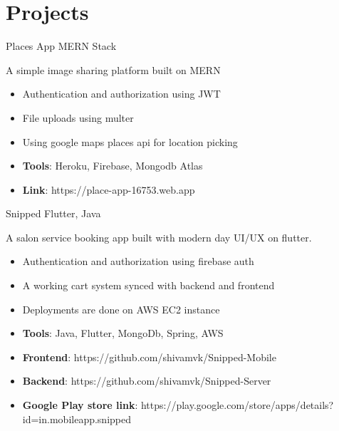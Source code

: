 \documentclass[letterpaper]{twentysecondcv} %
\begin{document}
\section{Projects}
\begin{twenty}
	\twentyitem
    	{}
		{}
        {Places App}
        {{}{MERN Stack}}
        {}
        {
       	\textbf{}A simple image sharing platform built on MERN 
        {\begin{itemize}
        \item Authentication and authorization using JWT
        \item File uploads using multer
        \item Using google maps places api for location picking
        \item \textbf{Tools}: Heroku, Firebase, Mongodb Atlas \item \textbf{Link}: https://place-app-16753.web.app \vspace{2mm}
		\end{itemize}}
        }
\end{twenty}
\vspace{2mm}
\begin{twenty}
	\twentyitem
    	{}
		{}
        {Snipped}
        {{}{Flutter, Java}}
        {}
        {
       	\textbf{}A salon service booking app built with modern day UI/UX on flutter.
        {\begin{itemize}
        \item Authentication and authorization using firebase auth
        \item A working cart system synced with backend and frontend
        \item Deployments are done on AWS EC2 instance
        \item \textbf{Tools}: Java, Flutter, MongoDb, Spring, AWS \item \textbf{Frontend}: https://github.com/shivamvk/Snipped-Mobile \item \textbf{Backend}: https://github.com/shivamvk/Snipped-Server \item \textbf{Google Play store link}: https://play.google.com/store/apps/details? id=in.mobileapp.snipped \vspace{2mm}
		\end{itemize}}
        }
\end{twenty}
\vspace{2mm}

\end{document}
